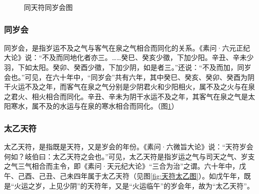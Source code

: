 \documentclass[12pt]{ctexbook}
\begin{document}
\begin{figure}[htb]%
  \centering%
  \caption{同天符同岁会图}\label{fig:同天符同岁会图}
\end{figure}

\subsubsection{同岁会}%

同岁会，是指岁运不及之气与客气在泉之气相合而同化的关系。《素问·六元正纪大论》说：“不及而同地化者亦三。……癸巳、癸亥少徵，下加少阳。辛丑、辛未少羽，下如太阳。癸卯、癸酉少徵，下加少阴，如是者三。”还说：“不及而加，同岁会也。”可见，在六十年中，“同岁会”共有六年，其中癸巳、癸亥、癸卯、癸酉为阴干火运不及之年，而客气在泉之气分别是少阴君火和少阳相火，属不及之火与在泉之君火、相火相合而同化。辛丑、辛未为阴干水运不及之年，其客气在泉之气是太阳寒水，属不及的水运与在泉的寒水相合而同化。（图\ref{fig:同天符同岁会图}）

\subsubsection{太乙天符}%

太乙天符，是指既是天符，又是岁会的年份。《素问·六微旨大论》说：“天符岁会何如？岐伯曰：太乙天符之会也。”可见，太乙天符是指岁运之气与司天之气、岁支之气三气相合而主令，即《素问·天元纪大论》“三合为治”之谓。六十年中，戊午、己酉、己丑、己未四年属于太乙天符（见图\ref{fig:天符太乙图}）。如戊午年，既是“火运之岁，上见少阴”的天符年，又是“火运临午”的岁会年，故为“太乙天符”。
\end{document}
